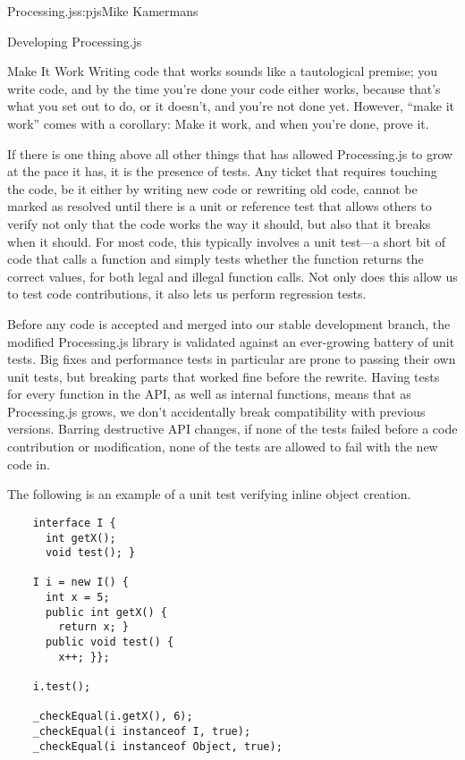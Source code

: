 \begin{aosachapter}{Processing.js}{s:pjs}{Mike Kamermans}
\begin{aosasect1}{Developing Processing.js}
\begin{aosasect2}{Make It Work}
Writing code that works sounds like a tautological premise; you write
code, and by the time you're done your code either works, because
that's what you set out to do, or it doesn't, and you're not done
yet. However, ``make it work'' comes with a corollary: Make it work, 
and when you're done, prove it.

If there is one thing above all other things that has allowed
Processing.js to grow at the pace it has, it is the presence of
tests. Any ticket that requires touching the code, be it either by
writing new code or rewriting old code, cannot be marked as resolved
until there is a unit or reference test that allows others to verify
not only that the code works the way it should, but also that it
breaks when it should. For most code, this typically involves a unit
test---a short bit of code that calls a function and simply tests
whether the function returns the correct values, for both legal and
illegal function calls. Not only does this allow us to test code
contributions, it also lets us perform regression tests.

Before any code is accepted and merged into our stable development
branch, the modified Processing.js library is validated against an
ever-growing battery of unit tests. Big fixes and performance tests in
particular are prone to passing their own unit tests, but 
breaking parts that worked fine before the rewrite. Having tests for
every function in the API, as well as internal functions, means that
as Processing.js grows, we don't accidentally break compatibility with
previous versions. Barring destructive API changes, if none of the
tests failed before a code contribution or modification, none of the
tests are allowed to fail with the new code in.

The following is an example of a unit test verifying inline object 
creation.

\begin{verbatim}
    interface I {
      int getX();
      void test(); }

    I i = new I() {
      int x = 5;
      public int getX() {
        return x; }
      public void test() {
        x++; }};

    i.test();

    _checkEqual(i.getX(), 6);
    _checkEqual(i instanceof I, true);
    _checkEqual(i instanceof Object, true);
\end{verbatim}


\end{aosasect2}
\end{aosasect1}
\end{aosachapter}
